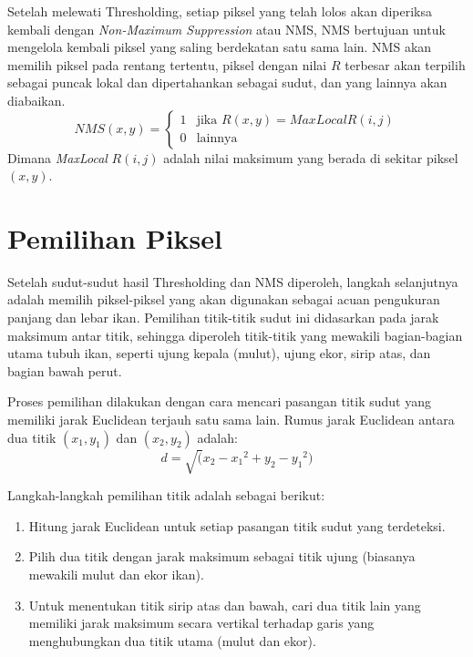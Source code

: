     Setelah melewati Thresholding, setiap piksel yang telah lolos akan diperiksa kembali dengan \emph{Non-Maximum Suppression} atau NMS,
NMS bertujuan untuk mengelola kembali piksel yang saling berdekatan satu sama lain. NMS akan memilih piksel pada rentang tertentu, piksel dengan nilai \(R\) terbesar akan terpilih sebagai puncak lokal dan dipertahankan sebagai sudut, dan yang lainnya akan diabaikan.
\begin{equation*}
    NMS(x,y) =
    \begin{cases}
        1 & \text{jika } R(x,y) = MaxLocal R(i,j) \\
        0 & \text{lainnya }
    \end{cases}
\end{equation*}
Dimana \emph{MaxLocal} \(R(i,j)\) adalah nilai maksimum yang berada di sekitar piksel \((x,y)\).

\section{Pemilihan Piksel}
    Setelah sudut-sudut hasil Thresholding dan NMS diperoleh, langkah selanjutnya adalah memilih piksel-piksel yang akan digunakan sebagai acuan pengukuran panjang dan lebar ikan. Pemilihan titik-titik sudut ini didasarkan pada jarak maksimum antar titik, sehingga diperoleh titik-titik yang mewakili bagian-bagian utama tubuh ikan, seperti ujung kepala (mulut), ujung ekor, sirip atas, dan bagian bawah perut.

    Proses pemilihan dilakukan dengan cara mencari pasangan titik sudut yang memiliki jarak Euclidean terjauh satu sama lain. Rumus jarak Euclidean antara dua titik \((x_1, y_1)\) dan \((x_2, y_2)\) adalah:
\begin{equation}
    d = \sqrt({x_2 - x_1}^2 + {y_2 - y_1}^2)
\end{equation}

    Langkah-langkah pemilihan titik adalah sebagai berikut:
\begin{enumerate}
    \item Hitung jarak Euclidean untuk setiap pasangan titik sudut yang terdeteksi.
    \item Pilih dua titik dengan jarak maksimum sebagai titik ujung (biasanya mewakili mulut dan ekor ikan).
    \item Untuk menentukan titik sirip atas dan bawah, cari dua titik lain yang memiliki jarak maksimum secara vertikal terhadap garis yang menghubungkan dua titik utama (mulut dan ekor).
\end{enumerate}

